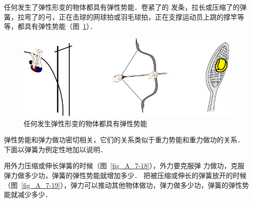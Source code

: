 任何发生了弹性形变的物体都具有弹性势能．卷紧了的
发条，拉长或压缩了的弹簧，拉弯了的弓，正在击球的网球拍或羽毛球拍，正在支撑运动员上跳的撑竿等等，都具有弹性势能（图~\ref{fig_A_7-17}）．
\begin{figure}[htbp]
    \centering
    \includegraphics{fig/A/7-17.pdf}
    \caption{任何发生弹性形变的物体都具有弹性势能}\label{fig_A_7-17}
\end{figure}

弹性势能和弹力做功密切相关，它们的关系类似于重力势能和重力做功的关系．
下面以弹簧为例定性地加以说明．


用外力压缩或伸长弹簧的时候（图~\ref{fig_A_7-18}），外力要克服弹
力做功，克服弹力做多少功，弹簧的弹性势能就增加多少．
把被压缩或伸长的弹簧放开的时候（图~\ref{fig_A_7-19}），弹力可以推动其他物体做功，弹力做多少功，弹簧的弹性势能就减少多少．

